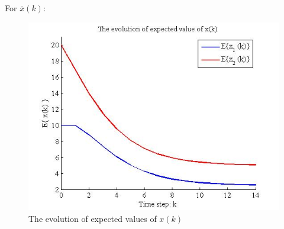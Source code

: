 \documentclass{article}
\begin{document}
For $\overline{x}(k)$:
\begin{figure}[H]
\begin{center}
	\includegraphics[scale=0.5]{figure/hw4_ex12.jpg}
	\caption{The evolution of expected values of $ x(k) $}
\end{center}
\end{figure}
\end{document}
